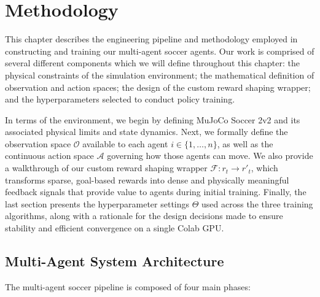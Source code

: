 \chapter{Methodology}
\label{ch:method}

This chapter describes the engineering pipeline and methodology employed in constructing and training our multi-agent soccer agents. Our work is comprised of several different components which we will define throughout this chapter: the physical constraints of the simulation environment; the mathematical definition of observation and action spaces; the design of the custom reward shaping wrapper; and the hyperparameters selected to conduct policy training.

In terms of the environment, we begin by defining MuJoCo Soccer 2v2 and its associated physical limits and state dynamics. Next, we formally define the observation space $\mathcal{O}$ available to each agent $i \in \{1, \dots, n\}$, as well as the continuous action space $\mathcal{A}$ governing how those agents can move. We also provide a walkthrough of our custom reward shaping wrapper $\mathcal{F}: r_t \rightarrow r'_t$, which transforms sparse, goal-based rewards into dense and physically meaningful feedback signals that provide value to agents during initial training. Finally, the last section presents the hyperparameter settings $\Theta$ used across the three training algorithms, along with a rationale for the design decisions made to ensure stability and efficient convergence on a single Colab GPU.

\section{Multi-Agent System Architecture}
\label{sec:method_design}

The multi-agent soccer pipeline is composed of four main phases:


